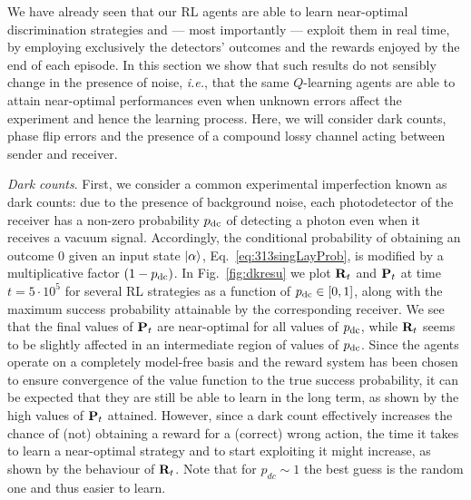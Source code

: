 We have already seen that our RL agents are able to learn near-optimal discrimination strategies and --- most importantly --- exploit them in real time, by employing exclusively the detectors' outcomes and the rewards enjoyed by the end of each episode. In this section we show that such results do not sensibly change in the presence of noise, \textit{i.e.}, that the same $Q$-learning agents are able to attain near-optimal performances even when unknown errors affect the experiment and hence the learning process. Here, we will consider dark counts, phase flip errors and the presence of a compound lossy channel acting between sender and receiver.

\textit{Dark counts}. First, we consider a common experimental imperfection known as dark counts: due to the presence of background noise, each photodetector of the receiver has a non-zero probability $p_{\rm dc}$ of detecting a photon even when it receives a vacuum signal. Accordingly, the conditional probability of obtaining an outcome $0$ given an input state $\ket\alpha$, Eq.~\eqref{eq:313singLayProb}, is modified by a multiplicative factor $(1-p_{\rm dc})$.
In Fig.~\ref{fig:dkresu} we plot $\mathbf{R}_{t}$ and $\mathbf{P}_{t}$ at time $t=5\cdot10^{5}$ for several RL strategies as a function of $p_{\rm dc}\in[0,1]$, along with the maximum success probability attainable by the corresponding receiver. We see that the final values of $\mathbf{P}_{t}$ are near-optimal for all values of $p_{\rm dc}$, while $\mathbf{R}_{t}$ seems to be slightly affected in an intermediate region of values of $p{\rm _{dc}}$. Since the agents operate on a completely model-free basis and the reward system has been chosen to ensure convergence of the value function to the true success probability, it can be expected that they are still be able to learn in the long term, as shown by the high values of $\mathbf{P}_{t}$ attained. However, since a dark count effectively increases the chance of (not) obtaining a reward for a (correct) wrong action, the time it takes to learn a near-optimal strategy and to start exploiting it might increase, as shown by the behaviour of $\mathbf{R}_{t}$.
Note that for $p_{dc}\sim 1$ the best guess is the random one and thus easier to learn.

